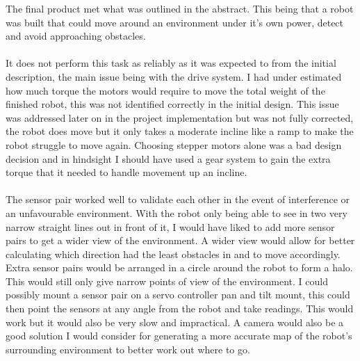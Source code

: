 The final product met what was outlined in the abstract.  This being that a robot was built that could move around an environment under it's own power, detect and avoid approaching obstacles.
\\\\It does not perform this task as reliably as it was expected to from the initial description, the main issue being with the drive system.  I had under estimated how much torque the motors would require to move the total weight of the finished robot, this was not identified correctly in the initial design.  This issue was addressed later on in the project implementation but was not fully corrected, the robot does move but it only takes a moderate incline like a ramp to make the robot struggle to move again.  Choosing stepper motors alone was a bad design decision and in hindsight I should have used a gear system to gain the extra torque that it needed to handle movement up an incline.
\\\\The sensor pair worked well to validate each other in the event of interference or an unfavourable environment.  With the robot only being able to see in two very narrow straight lines out in front of it, I would have liked to add more sensor pairs to get a wider view of the environment.  A wider view would allow for better calculating which direction had the least obstacles in and to move accordingly.
\\Extra sensor pairs would be arranged in a circle around the robot to form a halo.  This would still only give narrow points of view of the environment.  I could possibly mount a sensor pair on a servo controller pan and tilt mount, this could then point the sensors at any angle from the robot and take readings.  This would work but it would also be very slow and impractical.  A camera would also be a good solution I would consider for generating a more accurate map of the robot's surrounding environment to better work out where to go.

